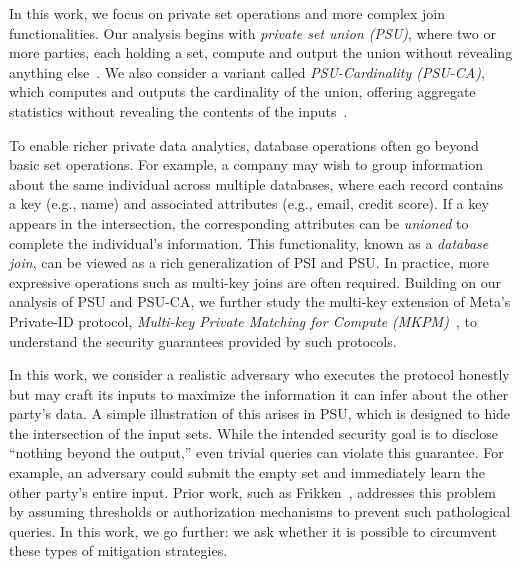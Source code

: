 In this work, we focus on private set operations and more complex join functionalities. Our analysis begins with \emph{private set union (PSU)}, where two or more parties, each holding a set, compute and output the union without revealing anything else~\cite{USENIX:DZBC25,USENIX:TBZCC25,USENIX:JSZG24,USENIX:ZCLZL23,USENIX:JSZDG22,CCS:GNBT25,CCS:ZCLPHW24,CCS:TCLZ23,ASIACCS:CSSW25,ASIACCS:BlaAgu12,AC:LiuGao23,AC:KRTW19,PoPETS:GaoNguTri24,ACNS:Frikken07,C:KisSon05,EC:PuJiaTri26,EC:PisTri26, USENIX:BSMD10}. 
We also consider a variant called \emph{PSU-Cardinality (PSU-CA)}, which computes and outputs the cardinality of the union, offering aggregate statistics without revealing the contents of the inputs~\cite{CCS:FMJS17, CANS:DeCGasTsu12}.

To enable richer private data analytics, database operations often go beyond basic set operations. For example, a company may wish to group information about the same individual across multiple databases, where each record contains a key (e.g., name) and associated attributes (e.g., email, credit score). If a key appears in the intersection, the corresponding attributes can be \emph{unioned} to complete the individual’s information. This functionality, known as a \emph{database join}, can be viewed as a rich generalization of PSI and PSU. 
In practice, more expressive operations such as multi-key joins are often required. Building on our analysis of PSU and PSU-CA, we further study the multi-key extension of Meta’s Private-ID protocol, \emph{Multi-key Private Matching for Compute (MKPM)}~\cite{MKPMC}, to understand the security guarantees provided by such protocols.


In this work, we consider a realistic adversary who executes the protocol honestly but may craft its inputs to maximize the information it can infer about the other party’s data.
A simple illustration of this arises in PSU, which is designed to hide the intersection of the input sets. While the intended security goal is to disclose ``nothing beyond the output,'' even trivial queries can violate this guarantee. For example, an adversary could submit the empty set and immediately learn the other party’s entire input. Prior work, such as Frikken~\cite{ACNS:Frikken07}, addresses this problem by assuming thresholds or authorization mechanisms to prevent such pathological queries. In this work, we go further: we ask whether it is possible to circumvent these types of mitigation strategies.

